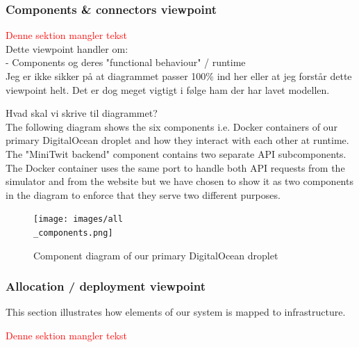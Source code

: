 \subsubsection{Components \& connectors viewpoint}
\textcolor{red}{Denne sektion mangler tekst}\\
Dette viewpoint handler om: \\
- Components og deres "functional behaviour" / runtime \\
Jeg er ikke sikker på at diagrammet passer 100\% ind her eller at jeg forstår dette viewpoint helt. Det er dog meget vigtigt i følge ham der har lavet modellen. 


Hvad skal vi skrive til diagrammet? \\


The following diagram shows the six components i.e. Docker containers of our primary DigitalOcean droplet and how they interact with each other at runtime. The "MiniTwit backend" component contains two separate API subcomponents. The Docker container uses the same port to handle both API requests from the simulator and from the website but we have chosen to show it as two components in the diagram to enforce that they serve two different purposes.
\begin{figure}[H]
 \centering
 \texttt{[image: images/all\\\_components.png]}
 \caption{Component diagram of our primary DigitalOcean droplet}
 \label{fig:CompleteComponentDiagram}
\end{figure}


\subsubsection{Allocation / deployment viewpoint}
This section illustrates how elements of our system is mapped to infrastructure.

\textcolor{red}{Denne sektion mangler tekst} \\

